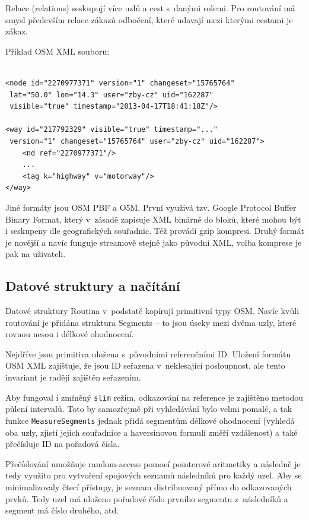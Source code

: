 \documentclass[thesis=B,czech]{FITthesis}[2012/06/26]
\begin{document}
 Relace (relations) seskupují více uzlů a cest s~danými rolemi. Pro routování má smysl především relace zákazů odbočení, které udavají mezi kterými cestami je zákaz.
 

{Příklad OSM XML souboru:}
\begin{verbatim}

<node id="2270977371" version="1" changeset="15765764" 
 lat="50.0" lon="14.3" user="zby-cz" uid="162287" 
 visible="true" timestamp="2013-04-17T18:41:18Z"/>

<way id="217792329" visible="true" timestamp="..." 
 version="1" changeset="15765764" user="zby-cz" uid="162287">
    <nd ref="2270977371"/>
    ...
    <tag k="highway" v="motorway"/>
</way>
\end{verbatim}


Jiné formáty jsou OSM PBF a O5M. První využivá tzv. Google Protocol Buffer Binary Format, který v~zásadě zapisuje XML binárně do bloků, které mohou být i seskupeny dle geografických souřadnic. Též provádí gzip kompresi. Druhý formát je novější a navíc funguje streamově stejně jako původní XML, volba komprese je pak na uživateli.



\subsection{Datové struktury a načítání}
Datové struktury Routina v~podstatě kopírují primitivní typy OSM. Navíc kvůli routování je přidána struktura Segments -- to jsou úseky mezi dvěma uzly, které rovnou nesou i délkové ohodnocení. 

Nejdříve jsou primitiva uložena s~původními referenčními ID. Uložení formátu OSM XML zajišťuje, že jsou ID seřazena v~neklesající posloupnost, ale tento invariant je raději zajištěn seřazením. 

Aby fungoval i zmíněný \verb|slim| režim, odkazování na reference je zajištěno metodou půlení intervalů. Toto by samozřejmě při vyhledávání bylo velmi pomalé, a tak funkce \verb|MeasureSegments| jednak přidá segmentům délkové ohodnocení (vyhledá oba uzly, zjistí jejich souřadnice a haversinovou formulí změří vzdálenost) a také přečísluje ID na pořadová čísla.

Přečíslování umožňuje random-access pomocí pointerové aritmetiky a následně je tedy využito pro vytvoření spojových seznamů následníků pro každý uzel. Aby se minimalizovaly čtecí přístupy, je seznam distribuovaný přímo do odkazovaných prvků. Tedy uzel má uloženo pořadové číslo prvního segmentu z~následníků a segment má číslo druhého, atd.
\end{document}
